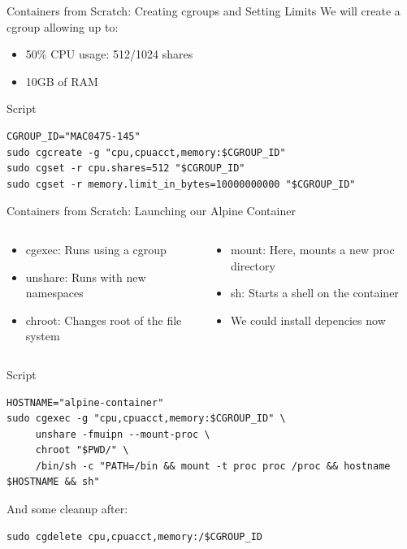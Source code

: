 \documentclass[10pt, compress, aspectratio=169, xcolor={table,usenames,dvipsnames}]{beamer}
\begin{document}
\begin{frame}[label={sec:orga1cecbe},fragile]{Containers from Scratch: Creating cgroups and Setting Limits}
 We will create a \alert{cgroup} allowing up to:
\begin{itemize}
\item \alert{50\%} CPU usage: 512/1024 \alert{shares}
\item \alert{10GB} of RAM
\end{itemize}

\begin{block}{Script}
\lstset{language=bash,label= ,caption= ,captionpos=b,numbers=none}
\begin{lstlisting}
CGROUP_ID="MAC0475-145"
sudo cgcreate -g "cpu,cpuacct,memory:$CGROUP_ID"
sudo cgset -r cpu.shares=512 "$CGROUP_ID"
sudo cgset -r memory.limit_in_bytes=10000000000 "$CGROUP_ID"
\end{lstlisting}
\end{block}
\end{frame}

\begin{frame}[label={sec:orgcbc7ad8},fragile]{Containers from Scratch: Launching our Alpine Container}
 \begin{columns}
\begin{column}{0.5\columnwidth}
\begin{itemize}
\item \alert{cgexec}: Runs using a cgroup
\item \alert{unshare}: Runs with new \alert{namespaces}
\item \alert{chroot}: Changes \alert{root} of the file system
\end{itemize}
\end{column}
\begin{column}{0.5\columnwidth}
\begin{itemize}
\item \alert{mount}: Here, mounts a new \alert{proc} directory
\item \alert{sh}: Starts a shell on the \alert{container}
\item We could install \alert{depencies} now
\end{itemize}
\end{column}
\end{columns}

\begin{block}{Script}
\lstset{language=bash,label= ,caption= ,captionpos=b,numbers=none}
\begin{lstlisting}
HOSTNAME="alpine-container"
sudo cgexec -g "cpu,cpuacct,memory:$CGROUP_ID" \
     unshare -fmuipn --mount-proc \
     chroot "$PWD/" \
     /bin/sh -c "PATH=/bin && mount -t proc proc /proc && hostname $HOSTNAME && sh"

\end{lstlisting}

And some \alert{cleanup} after:

\lstset{language=bash,label= ,caption= ,captionpos=b,numbers=none}
\begin{lstlisting}
sudo cgdelete cpu,cpuacct,memory:/$CGROUP_ID
\end{lstlisting}
\end{block}
\end{frame}
\end{document}
